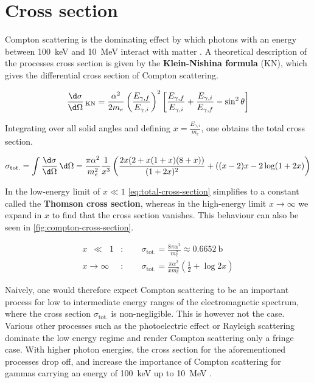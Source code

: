 
\section{Cross section}
\label{sec:compton-cross-section}

Compton scattering is the dominating effect by which photons with an energy between
\SI{100}{\kilo\electronvolt} and \SI{10}{\mega\electronvolt} interact with matter
\cite{damashek1970forward}. A theoretical description of the processes cross section
is given by the \textbf{Klein-Nishina formula} (KN), which gives the differential 
cross section of Compton scattering.

\begin{equation}
\label{eq:klein-nishina}
\frac{\d\sigma}{\d\Omega}\,_\text{KN} = \frac{\alpha^2}{2m_e}\left(\frac{E_{\gamma,f}}{E_{\gamma,i}}\right)^2\left[\frac{E_{\gamma,f}}{E_{\gamma,i}}+\frac{E_{\gamma,i}}{E_{\gamma,f}}-\sin^2\theta\right]
\end{equation}

Integrating over all solid angles and defining $x=\frac{E_{\gamma,i}}{m_e}$, one
obtains the total cross section.

\begin{equation}
\label{eq:total-cross-section}
\sigma_\text{tot.} = \int \frac{\d\sigma}{\d\Omega}\,\d\Omega = \frac{\pi\alpha^2}{m_e^2}\frac{1}{x^3}\left(\frac{2x(2+x(1+x)(8+x))}{(1+2x)^2} + ((x-2)x-2\log(1+2x)\right)
\end{equation}

In the low-energy limit of $x\ll1$ \autoref{eq:total-cross-section} simplifies to
a constant called the \textbf{Thomson cross section}, whereas in the high-energy
limit $x\rightarrow\infty$ we expand in $x$ to find that the cross section vanishes.
This behaviour can also be seen in \autoref{fig:compton-cross-section}.

\begin{align*}
x\;\:\ll\;\;1&:\qquad\sigma_\text{tot.} = \frac{8\pi\alpha^2}{m_e^2} \approx \SI{0.6652}{\barn}\\
x\longrightarrow\infty&:\qquad\sigma_\text{tot.} = \frac{\pi\alpha^2}{x m_e^2}\left(\frac{1}{2} + \log2x\right)
\end{align*}

Naively, one would therefore expect Compton scattering to be an important process
for low to intermediate energy ranges of the electromagnetic spectrum, where the
cross section $\sigma_\text{tot.}$ is non-negligible. This is however not the case.
Various other processes such as the photoelectric effect or Rayleigh scattering
dominate the low energy regime and render Compton scattering only a fringe case.
With higher photon energies, the cross section for the aforementioned processes
drop off, and increase the importance of Compton scattering for gammas carrying
an energy of \SI{100}{\kilo\electronvolt} up to \SI{10}{\mega\electronvolt} .

